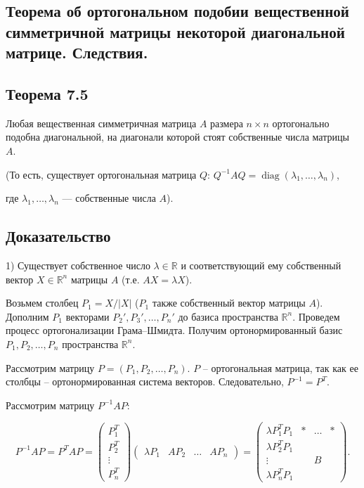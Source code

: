 {
\subsection{Теорема об ортогональном подобии вещественной симметричной матрицы некоторой диагональной матрице. Следствия.}
\subsection*{Теорема 7.5}

Любая вещественная симметричная матрица \( A \) размера \( n \times n \) ортогонально подобна диагональной, на диагонали которой стоят собственные числа матрицы \( A \).

(То есть, существует ортогональная матрица \( Q \): \( Q^{-1}AQ = \operatorname{diag}(\lambda_1, \ldots, \lambda_n) \),

где \( \lambda_1, \ldots, \lambda_n \) — собственные числа \( A \)).

\subsection*{Доказательство}

1) Существует собственное число \( \lambda \in \mathbb{R} \) и соответствующий ему собственный вектор \( X \in \mathbb{R}^n \) матрицы \( A \) (т.е. \( A X = \lambda X \)).

Возьмем столбец \( P_1 = X / |X| \) (\( P_1 \) также собственный вектор матрицы \( A \)). Дополним \( P_1 \) векторами \( P_2', P_3', \dots, P_n' \) до базиса пространства \( \mathbb{R}^n \). Проведем процесс ортогонализации Грама–Шмидта. Получим ортонормированный базис \( P_1, P_2, \dots, P_n \) пространства \( \mathbb{R}^n \).

Рассмотрим матрицу \( P = (P_1, P_2, \dots, P_n) \). \( P \) – ортогональная матрица, так как ее столбцы – ортонормированная система векторов. Следовательно, \( P^{-1} = P^T \).

Рассмотрим матрицу \( P^{-1} A P \):



\[
P^{-1} A P = P^T A P = 
\begin{pmatrix}
P_1^T \\
P_2^T \\
\vdots \\
P_n^T
\end{pmatrix}
\begin{pmatrix}
\lambda P_1 & A P_2 & \dots & A P_n
\end{pmatrix} =
\begin{pmatrix}
\lambda P_1^T P_1 & * & \dots & * \\
\lambda P_2^T P_1 &  &  &  \\
\vdots &  & B &  \\
\lambda P_n^T P_1 &  &  &
\end{pmatrix}.
\]



}
